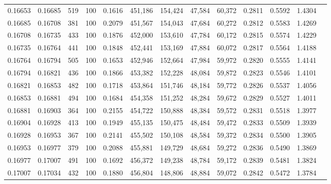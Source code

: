 \begin{tabular}{rrrrrrrrrrrrr}
0.16653 & 0.16685 &   519 & 100 &                                     0.1616 & 451,186 & 154,424 &  47,584 &  60,372 & 0.2811 & 0.5592 & 1.4304 \\
0.16685 & 0.16708 &   381 & 100 &                                     0.2079 & 451,567 & 154,043 &  47,684 &  60,272 & 0.2812 & 0.5583 & 1.4269 \\
0.16708 & 0.16735 &   433 & 100 &                                     0.1876 & 452,000 & 153,610 &  47,784 &  60,172 & 0.2815 & 0.5574 & 1.4229 \\
0.16735 & 0.16764 &   441 & 100 &                                     0.1848 & 452,441 & 153,169 &  47,884 &  60,072 & 0.2817 & 0.5564 & 1.4188 \\
0.16764 & 0.16794 &   505 & 100 &                                     0.1653 & 452,946 & 152,664 &  47,984 &  59,972 & 0.2820 & 0.5555 & 1.4141 \\
0.16794 & 0.16821 &   436 & 100 &                                     0.1866 & 453,382 & 152,228 &  48,084 &  59,872 & 0.2823 & 0.5546 & 1.4101 \\
0.16821 & 0.16853 &   482 & 100 &                                     0.1718 & 453,864 & 151,746 &  48,184 &  59,772 & 0.2826 & 0.5537 & 1.4056 \\
0.16853 & 0.16881 &   494 & 100 &                                     0.1684 & 454,358 & 151,252 &  48,284 &  59,672 & 0.2829 & 0.5527 & 1.4011 \\
0.16881 & 0.16903 &   364 & 100 &                                     0.2155 & 454,722 & 150,888 &  48,384 &  59,572 & 0.2831 & 0.5518 & 1.3977 \\
0.16904 & 0.16928 &   413 & 100 &                                     0.1949 & 455,135 & 150,475 &  48,484 &  59,472 & 0.2833 & 0.5509 & 1.3939 \\
0.16928 & 0.16953 &   367 & 100 &                                     0.2141 & 455,502 & 150,108 &  48,584 &  59,372 & 0.2834 & 0.5500 & 1.3905 \\
0.16953 & 0.16977 &   379 & 100 &                                     0.2088 & 455,881 & 149,729 &  48,684 &  59,272 & 0.2836 & 0.5490 & 1.3869 \\
0.16977 & 0.17007 &   491 & 100 &                                     0.1692 & 456,372 & 149,238 &  48,784 &  59,172 & 0.2839 & 0.5481 & 1.3824 \\
0.17007 & 0.17034 &   432 & 100 &                                     0.1880 & 456,804 & 148,806 &  48,884 &  59,072 & 0.2842 & 0.5472 & 1.3784 \\

\end{tabular}
